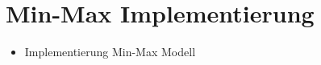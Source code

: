 \section{Min-Max Implementierung}
\begin{itemize}
\item Implementierung Min-Max Modell
\end{itemize}